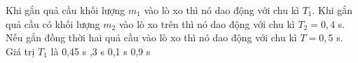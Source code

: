 \begin{ex}%
Khi gắn quả cầu khối lượng $m_{1}$ vào lò xo thì nó dao động với chu kì $T_1$. Khi gắn quả cầu có khối lượng $m_{2}$ vào lò xo trên thì nó dao động với chu kì $T_2 = 0,4$ s. Nếu gắn đồng thời hai quả cầu vào lò xo thì nó dao động với chu kì $T = 0,5$ s. Giá trị $T_1$ là
\choice
{0,45 s}
{,3 s}
{0,1 s}
{0,9 s}
\end{ex} 

